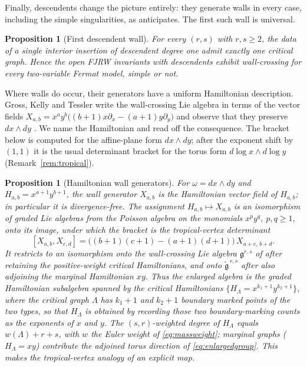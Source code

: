 \documentclass[11pt]{amsart}
\newtheorem{proposition}[theorem]{Proposition}
\theoremstyle{definition}
\theoremstyle{remark}
\newcommand{\gfrak}{\mathfrak{g}}
\begin{document}
Finally, descendents change the picture entirely: they generate walls in every
case, including the simple singularities, as \cite[Remark~0.9]{GKT} anticipates.
The first such wall is universal.

\begin{proposition}[First descendent wall]
\label{prop:descendent}
For every $(r,s)$ with $r,s\geq2$, the data of a single interior insertion of
descendent degree one admit exactly one critical graph. Hence the open FJRW invariants with descendents
exhibit wall-crossing for every two-variable Fermat model, simple or not.
\end{proposition}

Where walls do occur, their generators have a uniform Hamiltonian description.
Gross, Kelly and Tessler write the wall-crossing Lie algebra in terms of the
vector fields
$X_{a,b}=x^{a}y^{b}\bigl((b{+}1)x\partial_{x}-(a{+}1)y\partial_{y}\bigr)$
\cite[eqn.~(4.19)]{GKT} and observe that they preserve $dx\wedge dy$
\cite[p.~89]{GKT}. We name the Hamiltonian and read off the consequence.  The
bracket below is computed for the affine-plane form $dx\wedge dy$; after the
exponent shift by $(1,1)$ it is the usual determinant bracket for the torus
form $d\log x\wedge d\log y$ (Remark~\ref{rem:tropical}).

\begin{proposition}[Hamiltonian wall generators]
\label{prop:ham}
For $\omega=dx\wedge dy$ and $H_{a,b}=x^{a+1}y^{b+1}$, the wall generator
$X_{a,b}$ is the Hamiltonian vector field of $H_{a,b}$; in particular it is
divergence-free. The assignment $H_{a,b}\mapsto X_{a,b}$ is an isomorphism of
graded Lie algebras from the Poisson algebra on the monomials $x^{p}y^{q}$,
$p,q\geq1$, onto its image, under which the bracket is the tropical-vertex
determinant
\[
[X_{a,b},X_{c,d}]=\bigl((b{+}1)(c{+}1)-(a{+}1)(d{+}1)\bigr)\,X_{a+c,\,b+d}.
\]
It restricts to an isomorphism onto the wall-crossing Lie algebra
$\mathfrak g^{r,s}$ of \cite{GKT} after retaining the positive-weight critical
Hamiltonians, and onto $\widetilde{\gfrak}^{\,r,s}$ after also adjoining
the marginal Hamiltonian $xy$. Thus the enlarged algebra is the graded
Hamiltonian subalgebra spanned by the critical Hamiltonians
$\{H_{\Lambda}=x^{k_{1}+1}y^{k_{2}+1}\}$, where the critical graph $\Lambda$ has
$k_{1}{+}1$ and $k_{2}{+}1$ boundary marked points of the two types, so that
$H_{\Lambda}$ is obtained by recording those two boundary-marking counts as
the exponents of $x$ and $y$.
The $(s,r)$-weighted degree of $H_{\Lambda}$ equals $w(\Lambda)+r+s$, with
$w$ the Euler weight of \eqref{eq:massweight}; marginal graphs
($H_{\Lambda}=xy$) contribute the adjoined torus direction of
\eqref{eq:enlargedgroup}. This makes the tropical-vertex analogy of
\cite[Remarks~0.8 and~4.20]{GKT} an explicit map.
\end{proposition}
\end{document}
